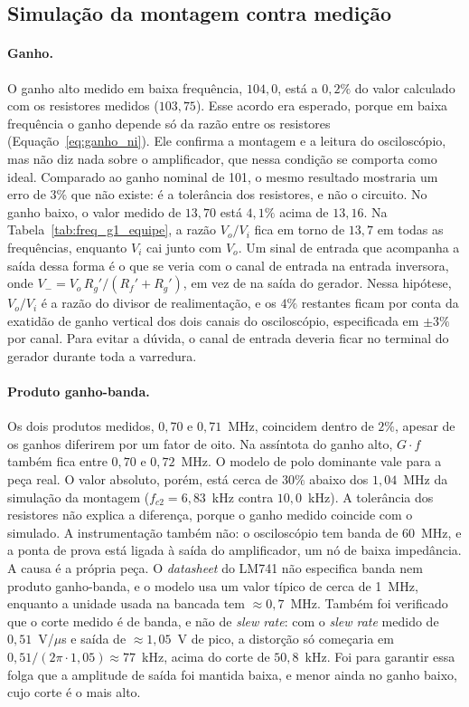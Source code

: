 \documentclass[11pt,a4paper]{article}
\begin{document}
\subsection{Simulação da montagem contra medição}

\paragraph{Ganho.} O ganho alto medido em baixa frequência, $104{,}0$, está a $0{,}2\%$ do valor
calculado com os resistores medidos ($103{,}75$). Esse acordo era esperado, porque em baixa
frequência o ganho depende só da razão entre os resistores (Equação~\eqref{eq:ganho_ni}). Ele
confirma a montagem e a leitura do osciloscópio, mas não diz nada sobre o amplificador, que nessa
condição se comporta como ideal. Comparado ao ganho nominal de 101, o mesmo resultado mostraria um
erro de $3\%$ que não existe: é a tolerância dos resistores, e não o circuito. No ganho baixo, o
valor medido de $13{,}70$ está $4{,}1\%$ acima de $13{,}16$. Na Tabela~\ref{tab:freq_g1_equipe}, a
razão $V_o/V_i$ fica em torno de $13{,}7$ em todas as frequências, enquanto $V_i$ cai junto com
$V_o$. Um sinal de entrada que acompanha a saída dessa forma é o que se veria com o canal de
entrada na entrada inversora, onde $V_-=V_o\,R_g'/(R_f'+R_g')$, em vez de na saída do gerador. Nessa
hipótese, $V_o/V_i$ é a razão do divisor de realimentação, e os $4\%$ restantes ficam por conta da
exatidão de ganho vertical dos dois canais do osciloscópio, especificada em $\pm3\%$ por canal.
Para evitar a dúvida, o canal de entrada deveria ficar no terminal do gerador durante toda a
varredura.

\paragraph{Produto ganho-banda.} Os dois produtos medidos, $0{,}70$ e $0{,}71$~MHz, coincidem
dentro de $2\%$, apesar de os ganhos diferirem por um fator de oito. Na assíntota do ganho alto,
$G\cdot f$ também fica entre $0{,}70$ e $0{,}72$~MHz. O modelo de polo dominante vale para a peça
real. O valor absoluto, porém, está cerca de $30\%$ abaixo dos $1{,}04$~MHz da simulação da
montagem ($f_{c2}=6{,}83$~kHz contra $10{,}0$~kHz). A tolerância dos resistores não explica a
diferença, porque o ganho medido coincide com o simulado. A instrumentação também não: o
osciloscópio tem banda de 60~MHz, e a ponta de prova está ligada à saída do amplificador, um nó de
baixa impedância. A causa é a própria peça. O \textit{datasheet} do LM741 não especifica banda nem
produto ganho-banda, e o modelo usa um valor típico de cerca de 1~MHz, enquanto a unidade usada na
bancada tem $\approx0{,}7$~MHz. Também foi verificado que o corte medido é de banda, e não de
\textit{slew rate}: com o \textit{slew rate} medido de $0{,}51$~V/$\mu$s e saída de
$\approx1{,}05$~V de pico, a distorção só começaria em $0{,}51/(2\pi\cdot1{,}05)\approx77$~kHz,
acima do corte de $50{,}8$~kHz. Foi para garantir essa folga que a amplitude de saída foi mantida
baixa, e menor ainda no ganho baixo, cujo corte é o mais alto.
\end{document}
